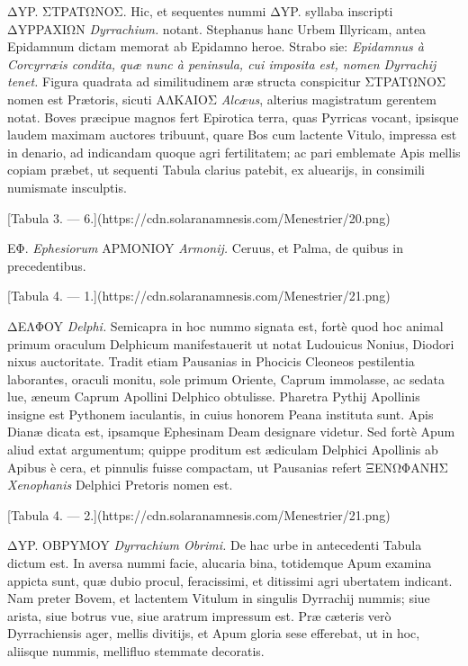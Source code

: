 \documentclass[a4paper, 11pt, oneside, polutonikogreek, latin]{article}
\begin{document}
ΔYP. ΣTPATΩNOΣ. Hic, et sequentes nummi ΔYP. syllaba inscripti ΔYPPAXIΩN \emph{Dyrrachium.} notant. Stephanus hanc Urbem Illyricam, antea Epidamnum dictam memorat ab Epidamno heroe. Strabo sie: \emph{Epidamnus à Corcyrræis condita, quæ nunc à peninsula, cui imposita est, nomen Dyrrachij tenet.} Figura quadrata ad similitudinem aræ structa conspicitur ΣTPATΩNOΣ nomen est Prætoris, sicuti AΛKAIOΣ \emph{Alcæus}, alterius magistratum gerentem notat. Boves præcipue magnos fert Epirotica terra, quas Pyrricas vocant, ipsisque laudem maximam auctores tribuunt, quare Bos cum lactente Vitulo, impressa est in denario, ad indicandam quoque agri fertilitatem; ac pari emblemate Apis mellis copiam præbet, ut sequenti Tabula clarius patebit, ex aluearijs, in consimili numismate insculptis.

[Tabula 3. --- 6.](https://cdn.solaranamnesis.com/Menestrier/20.png)

EΦ. \emph{Ephesiorum} APMONIOY \emph{Armonij.} Ceruus, et Palma, de quibus in precedentibus.

[Tabula 4. --- 1.](https://cdn.solaranamnesis.com/Menestrier/21.png)

ΔEΛΦOY \emph{Delphi.} Semicapra in hoc nummo signata est, fortè quod hoc animal primum oraculum Delphicum manifestauerit ut notat Ludouicus Nonius, Diodori nixus auctoritate. Tradit etiam Pausanias in Phocicis Cleoneos pestilentia laborantes, oraculi monitu, sole primum Oriente, Caprum immolasse, ac sedata lue, æneum Caprum Apollini Delphico obtulisse. Pharetra Pythij Apollinis insigne est Pythonem iaculantis, in cuius honorem Peana instituta sunt. Apis Dianæ dicata est, ipsamque Ephesinam Deam designare videtur. Sed fortè Apum aliud extat argumentum; quippe proditum est ædiculam Delphici Apollinis ab Apibus è cera, et pinnulis fuisse compactam, ut Pausanias refert ΞENΩΦANHΣ \emph{Xenophanis} Delphici Pretoris nomen est.

[Tabula 4. --- 2.](https://cdn.solaranamnesis.com/Menestrier/21.png)

ΔYP. OBPYMOY \emph{Dyrrachium Obrimi.} De hac urbe in antecedenti Tabula dictum est. In aversa nummi facie, alucaria bina, totidemque Apum examina appicta sunt, quæ dubio procul, feracissimi, et ditissimi agri ubertatem indicant. Nam preter Bovem, et lactentem Vitulum in singulis Dyrrachij nummis; siue arista, siue botrus vue, siue aratrum impressum est. Præ cæteris verò Dyrrachiensis ager, mellis divitijs, et Apum gloria sese efferebat, ut in hoc, aliisque nummis, mellifluo stemmate decoratis.
\end{document}
